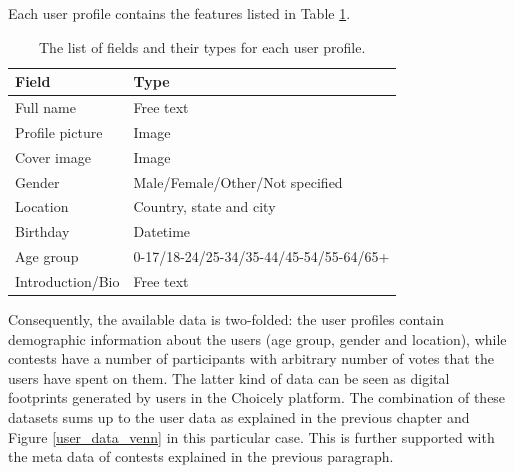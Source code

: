     Each user profile contains the features listed in Table \ref{user_profile_fields}. %

    \begin{table}[]
        \centering
        \begin{tabular}{l|l}
            \textbf{Field}              & \textbf{Type} \\
            \hline
            Full name                   & Free text \\
            Profile picture             & Image \\ 
            Cover image                 & Image \\
            Gender                      & Male/Female/Other/Not specified \\
            Location                    & Country, state and city \\
            Birthday                    & Datetime \\ 
            Age group                   & 0-17/18-24/25-34/35-44/45-54/55-64/65+ \\
            Introduction/Bio            & Free text
        \end{tabular}
        \caption{The list of fields and their types for each user profile.}
        \label{user_profile_fields}
    \end{table}  

    Consequently, the available data is two-folded: the user profiles contain demographic information about the users (age group, gender and location), while contests have a number of participants with arbitrary number of votes that the users have spent on them. The latter kind of data can be seen as digital footprints generated by users in the Choicely platform. The combination of these datasets sums up to the user data as explained in the previous chapter and Figure \ref{user_data_venn} in this particular case. This is further supported with the meta data of contests explained in the previous paragraph. 


